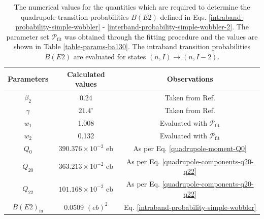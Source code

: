 \begin{table}
    \centering
    \begin{tabular}{|c|c|c|}
    \hline
    Parameters & Calculated values & Observations                                               \\ \hline
    $\beta_2$  & 0.24              & Taken from Ref. \cite{chen2019transverse}                 \\ \hline
    $\gamma$   & $21.4^\circ$      & Taken from Ref. \cite{chen2019transverse}                 \\ \hline
    $w_1$      & 1.008             & Evaluated with $\mathcal{P}_\text{fit}$                    \\ \hline
    $w_2$      & 0.132             & Evaluated with $\mathcal{P}_\text{fit}$                    \\ \hline
    $Q_0$      & $390.376\times10^{-2}$ $\text{eb}$ & As per Eq. \ref{quadrupole-moment-Q0}                                                           \\ \hline
    $Q_{20}$   & $363.213\times10^{-2}$ $\text{eb}$ & As per Eq. \ref{quadrupole-components-q20-q22}                                                            \\ \hline
    $Q_{22}$   & $101.168\times10^{-2}$ $\text{eb}$ & As per Eq. \ref{quadrupole-components-q20-q22}                                                            \\ \hline
    $B(E2)_\text{in}$ &        0.0509 $(eb)^2$          & Eq. \ref{intraband-probability-simple-wobbler}              \\ \hline
    \end{tabular}%
    \caption{The numerical values for the quantities which are required to determine the quadrupole transition probabilities $B(E2)$ defined in Eqs. \ref{intraband-probability-simple-wobbler} - \ref{interband-probability-simple-wobbler-2}. The parameter set $\mathcal{P}_\text{fit}$ was obtained through the fitting procedure and the values are shown in Table \ref{table-params-ba130}. The intraband transition probabilities $B(E2)$ are evaluated for states $(n,I)\to(n,I-2)$.}
    \label{transition-parameters-ba130}
\end{table}

